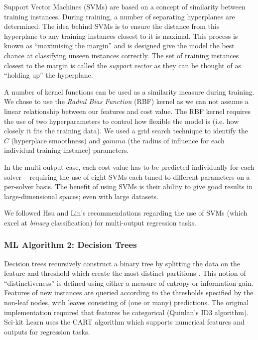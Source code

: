 Support Vector Machines (SVMs) \cite{svm} are based on a concept of similarity between training instances. 
During training, a number of separating hyperplanes are determined.
The idea behind SVMs is to ensure the distance from this hyperplane to any training instances closest to it is maximal.
This process is known as ``maximising the margin'' and is designed give the model the best chance at classifying unseen instances correctly. 
The set of training instances closest to the margin is called the \textit{support vector} as they can be thought of as ``holding up'' the hyperplane.

A number of kernel functions can be used as a similarity measure during training.
We chose to use the \textit{Radial Bias Function} (RBF) kernel as we can not assume a linear relationship between our features and cost value. 
The RBF kernel requires the use of two hyperparameters to control how flexible the model is (i.e. how closely it fits the training data). 
We used a grid search technique \cite{hsu2003practical} to identify the $C$ (hyperplace smoothness) and $gamma$ (the radius of influence for each individual training instance) parameters.

In the multi-output case, each cost value has to be predicted individually for each solver -- requiring the use of eight SVMs each tuned to different parameters on a per-solver basis.
The benefit of using SVMs is their ability to give good results in large-dimensional spaces; even with large datasets. 

We followed Hsu and Lin's \cite{MulticlassSVM} recommendations regarding the use of SVMs (which excel at \textit{binary} classification) for  multi-output regression tasks. 

\subsubsection{ML Algorithm 2: Decision Trees}

Decision trees recursively construct a binary tree by  splitting the data on the feature and threshold which create the most distinct partitions \cite{DecisionTrees}.
This notion of ``distinctiveness'' is defined using either a measure of entropy or information gain.
Features of new instances are queried according to the thresholds specified by the non-leaf nodes, with leaves consisting of (one or many) predictions. 
The original implementation required that features be categorical (Quinlan's ID3 algorithm). 
Sci-kit Learn uses the CART \cite{cart} algorithm which supports numerical features and outputs for regression tasks.  

